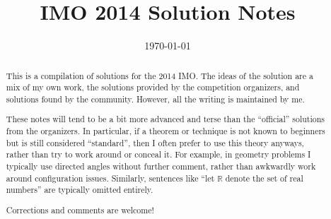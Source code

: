 \documentclass[11pt]{scrartcl}
\title{IMO 2014 Solution Notes}
\date{\today}
\begin{document}
\maketitle

\begin{abstract}
This is a compilation of solutions
for the 2014 IMO.
The ideas of the solution are a mix of my own work,
the solutions provided by the competition organizers,
and solutions found by the community.
However, all the writing is maintained by me.

These notes will tend to be a bit more advanced and terse than the ``official''
solutions from the organizers.
In particular, if a theorem or technique is not known to beginners
but is still considered ``standard'', then I often prefer to
use this theory anyways, rather than try to work around or conceal it.
For example, in geometry problems I typically use directed angles
without further comment, rather than awkwardly work around configuration issues.
Similarly, sentences like ``let $\mathbb{R}$ denote the set of real numbers''
are typically omitted entirely.

Corrections and comments are welcome!
\end{abstract}

\tableofcontents
\newpage

\addtocounter{section}{-1}
\end{document}
